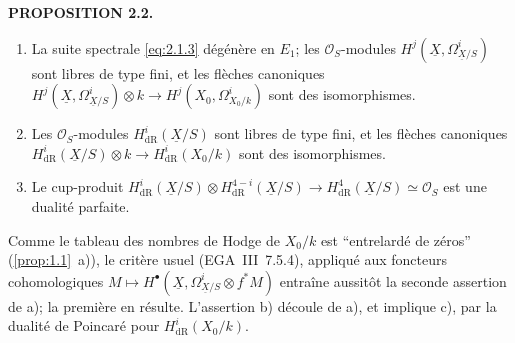 \documentclass[10pt]{article}
\makeatletter
\newcommand{\UX}{\underline{X}}
\newcommand{\sourceanchor}[2]{\begingroup\def\@currentlabel{#2}\label{#1}\endgroup}
\newenvironment{sourcestatement}[3]{\par\smallskip\noindent\textbf{#1 #2.}\sourceanchor{#3}{#2}\ \itshape}{\par\normalfont\smallskip}
\makeatother
\begin{document}
\begin{sourcestatement}{PROPOSITION}{2.2}{prop:2.2}
\begin{enumerate}[label=\alph*)]
\item La suite spectrale \eqref{eq:2.1.3} dégénère en $E_1$; les $\mathcal{O}_S$-modules $H^j(\UX, \Omega_{\UX/S}^i)$ sont libres de type fini, et les flèches canoniques $H^j(\UX, \Omega_{\UX/S}^i) \otimes k \to H^j(X_0, \Omega_{X_0/k}^i)$ sont des isomorphismes.
\item Les $\mathcal{O}_S$-modules $H^i_{\mathrm{dR}}(\UX/S)$ sont libres de type fini, et les flèches canoniques $H^i_{\mathrm{dR}}(\UX/S) \otimes k \to H^i_{\mathrm{dR}}(X_0/k)$ sont des isomorphismes.
\item Le cup-produit $H^i_{\mathrm{dR}}(\UX/S) \otimes H^{4-i}_{\mathrm{dR}}(\UX/S) \to H^4_{\mathrm{dR}}(\UX/S) \simeq \mathcal{O}_S$ est une dualité parfaite.
\end{enumerate}
\end{sourcestatement}

Comme le tableau des nombres de Hodge de $X_0/k$ est ``entrelardé de zéros'' (\ref{prop:1.1}~a)), le critère usuel (EGA~III~7.5.4), appliqué aux foncteurs cohomologiques $M \mapsto H^{\bullet}(\UX, \Omega_{\UX/S}^i \otimes f^* M)$ entraîne aussitôt la seconde assertion de a); la première en résulte. L'assertion b) découle de a), et implique c), par la dualité de Poincaré pour $H^i_{\mathrm{dR}}(X_0/k)$.
\end{document}
